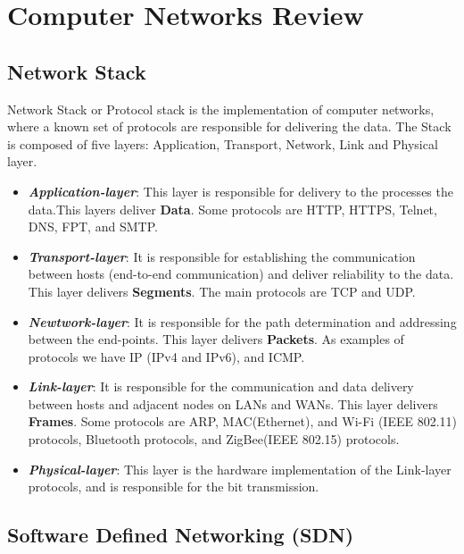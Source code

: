 \chapter{Computer Networks Review}
\label{ap:networks}

\section{Network Stack}

Network Stack\cite{kurose} or Protocol stack is the implementation of computer networks, where a known set of protocols are responsible for delivering the data.  The Stack is composed of five layers: Application, Transport, Network, Link and Physical layer.
\begin{itemize}
    \item \textit{\textbf{Application-layer}}: This layer is responsible for delivery to the processes the data.This layers deliver \textbf{Data}. Some protocols are HTTP, HTTPS, Telnet, DNS, FPT, and SMTP.
    \item \textit{\textbf{Transport-layer}}: It is responsible for establishing the communication between hosts (end-to-end communication) and deliver reliability to the data. This layer delivers \textbf{Segments}. The main protocols are TCP and UDP.
    \item \textit{\textbf{Newtwork-layer}}: It is responsible for the path determination and addressing between the end-points. This layer delivers \textbf{Packets}. As examples of protocols we have IP (IPv4 and IPv6), and ICMP. 
    \item \textit{\textbf{Link-layer}}: It is responsible for the communication and data delivery between hosts and adjacent nodes on LANs and WANs. This layer delivers \textbf{Frames}. Some protocols are \acrshort{ARP}, \acrshort{MAC}(Ethernet), and Wi-Fi (IEEE 802.11) protocols, Bluetooth protocols, and ZigBee(IEEE 802.15) protocols. 
    \item \textit{\textbf{Physical-layer}}: This layer is the hardware implementation of the Link-layer protocols, and is responsible for the bit transmission. 
\end{itemize}

\section{Software Defined Networking (SDN)}


